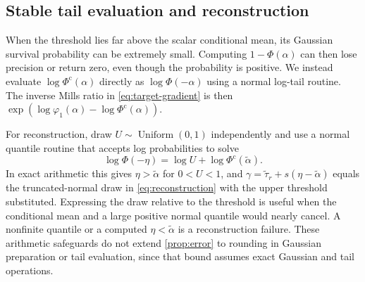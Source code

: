 \subsection{Stable tail evaluation and reconstruction}
\label{subsec:tail-computation}

When the threshold lies far above the scalar conditional mean, its
Gaussian survival probability can be extremely small. Computing
$1-\Phi(\alpha)$ can then lose precision or return zero, even
though the probability is positive. We instead evaluate
$\log\Phi^{\mathrm c}(\alpha)$ directly as $\log\Phi(-\alpha)$ using a
normal log-tail routine. The inverse Mills ratio
in \cref{eq:target-gradient} is then
$\exp(\log\varphi_1(\alpha)-\log\Phi^{\mathrm c}(\alpha))$.

For reconstruction, draw $U\sim\operatorname{Uniform}(0,1)$
independently and use a normal quantile routine that accepts log
probabilities to solve
\[
 \log\Phi(-\eta)=\log U+\log\Phi^{\mathrm c}(\widetilde\alpha).
\]
In exact arithmetic this gives $\eta>\widetilde\alpha$ for
$0<U<1$, and
$\gamma=\widetilde\tau_r+s(\eta-\widetilde\alpha)$ equals the
truncated-normal draw in \cref{eq:reconstruction} with the upper
threshold substituted. Expressing the draw relative to the threshold
is useful when the conditional mean and a large positive normal
quantile would nearly cancel. A nonfinite quantile or a
computed $\eta<\widetilde\alpha$ is a reconstruction failure.
These arithmetic safeguards do not extend \cref{prop:error} to
rounding in Gaussian preparation or tail evaluation, since that
bound assumes exact Gaussian and tail operations.
